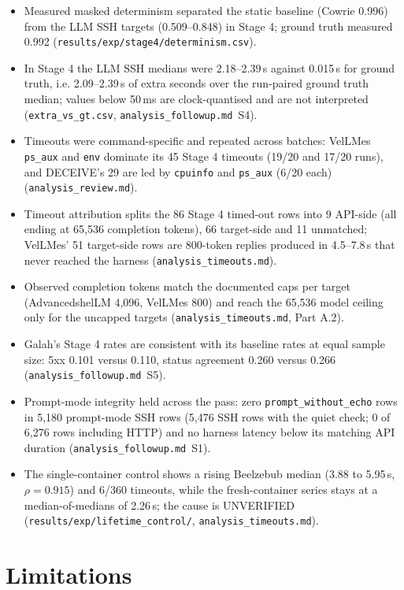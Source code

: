 \documentclass[a4paper,11pt]{article}
\begin{document}
\begin{itemize}[leftmargin=*]
\item Measured masked determinism separated the static baseline (Cowrie 0.996)
  from the LLM SSH targets (0.509--0.848) in Stage 4; ground truth measured
  0.992 (\texttt{results/exp/stage4/determinism.csv}).
\item In Stage 4 the LLM SSH medians were 2.18--2.39\,s against 0.015\,s for
  ground truth, i.e. 2.09--2.39\,s of extra seconds over the run-paired ground
  truth median; values below 50\,ms are clock-quantised and are not
  interpreted (\texttt{extra\_vs\_gt.csv}, \texttt{analysis\_followup.md}~S4).
\item Timeouts were command-specific and repeated across batches: VelLMes
  \texttt{ps\_aux} and \texttt{env} dominate its 45 Stage 4 timeouts (19/20 and
  17/20 runs), and DECEIVE's 29 are led by \texttt{cpuinfo} and \texttt{ps\_aux}
  (6/20 each) (\texttt{analysis\_review.md}).
\item Timeout attribution splits the 86 Stage 4 timed-out rows into 9 API-side
  (all ending at 65,536 completion tokens), 66 target-side and 11 unmatched;
  VelLMes' 51 target-side rows are 800-token replies produced in 4.5--7.8\,s
  that never reached the harness (\texttt{analysis\_timeouts.md}).
\item Observed completion tokens match the documented caps per target
  (AdvancedshelLM 4,096, VelLMes 800) and reach the 65,536 model ceiling only
  for the uncapped targets (\texttt{analysis\_timeouts.md}, Part A.2).
\item Galah's Stage 4 rates are consistent with its baseline rates at equal
  sample size: 5xx 0.101 versus 0.110, status agreement 0.260 versus 0.266
  (\texttt{analysis\_followup.md}~S5).
\item Prompt-mode integrity held across the pass: zero
  \texttt{prompt\_without\_echo} rows in 5,180 prompt-mode SSH rows (5,476 SSH
  rows with the quiet check; 0 of 6,276 rows including HTTP) and no harness
  latency below its matching API duration (\texttt{analysis\_followup.md}~S1).
\item The single-container control shows a rising Beelzebub median
  (3.88 to 5.95\,s, $\rho=0.915$) and 6/360 timeouts, while the fresh-container
  series stays at a median-of-medians of 2.26\,s; the cause is UNVERIFIED
  (\texttt{results/exp/lifetime\_control/}, \texttt{analysis\_timeouts.md}).
\end{itemize}

\section{Limitations}
\end{document}
